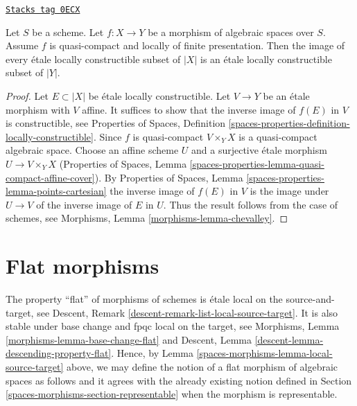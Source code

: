 \begin{theorem}

\label{spaces-morphisms-theorem-chevalley}
\href{https://stacks.math.columbia.edu/tag/0ECX}{\texttt{Stacks tag 0ECX}}

Let $S$ be a scheme.
Let $f : X \to Y$ be a morphism of algebraic spaces over $S$.
Assume $f$ is quasi-compact and locally of finite presentation.
Then the image of every \'etale locally constructible subset of $|X|$ is
an \'etale locally constructible subset of $|Y|$.
\end{theorem}

\begin{proof}
Let $E \subset |X|$ be \'etale locally constructible.
Let $V \to Y$ be an \'etale morphism with $V$ affine.
It suffices to show that the inverse image of $f(E)$ in
$V$ is constructible, see Properties of Spaces, Definition
\ref{spaces-properties-definition-locally-constructible}.
Since $f$ is quasi-compact $V \times_Y X$ is a quasi-compact algebraic space.
Choose an affine scheme $U$ and a surjective \'etale morphism
$U \to V \times_Y X$ (Properties of Spaces, Lemma
\ref{spaces-properties-lemma-quasi-compact-affine-cover}).
By Properties of Spaces, Lemma \ref{spaces-properties-lemma-points-cartesian}
the inverse image of $f(E)$ in $V$ is the image under $U \to V$
of the inverse image of $E$ in $U$.
Thus the result follows from the case of schemes, see
Morphisms, Lemma \ref{morphisms-lemma-chevalley}.
\end{proof}

\section{Flat morphisms}
\label{spaces-morphisms-section-flat}
The property ``flat'' of morphisms of schemes is
\'etale local on the source-and-target, see
Descent, Remark \ref{descent-remark-list-local-source-target}.
It is also stable under base change and fpqc local on the target, see
Morphisms, Lemma \ref{morphisms-lemma-base-change-flat} and
Descent, Lemma \ref{descent-lemma-descending-property-flat}.
Hence, by
Lemma \ref{spaces-morphisms-lemma-local-source-target}
above, we may define the notion of a flat morphism of algebraic spaces as
follows and it agrees with the already existing notion defined in
Section \ref{spaces-morphisms-section-representable}
when the morphism is representable.

